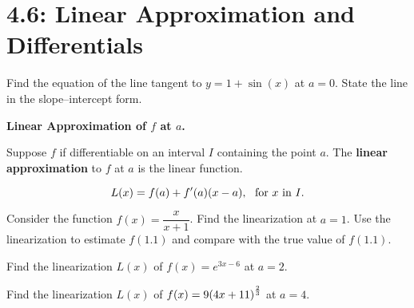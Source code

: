 \documentclass[answers]{exam}
\begin{document}
\section{4.6: Linear Approximation and Differentials}
\begin{ex*}
  Find the equation of the line tangent to $y=1+\sin(x)$ at $a=0$. State the line in the slope--intercept form.
\end{ex*}
\begin{flushright}
\end{flushright}
\begin{defn*}
  \textbf{Linear Approximation of $f$ at $a$.}
  
  Suppose $f$ if differentiable on an interval $I$ containing the point $a$. The \textbf{linear approximation} to $f$ at $a$ is the linear function.
  
  $$L(x)=f(a)+f'(a)(x-a),\ \textnormal{ for } x \textnormal{ in } I.$$
\end{defn*}
\pagebreak

\begin{ex*}
  Consider the function $f(x)=\dfrac{x}{x+1}$. Find the linearization at $a=1$. Use the linearization to estimate $f(1.1)$ and compare with the true value of $f(1.1)$.
\end{ex*}
\pagebreak

\begin{ex*}
  Find the linearization $L(x)$ of $f(x)=e^{3x-6}$ at $a=2$.
\end{ex*}

\begin{ex*}
  Find the linearization $L(x)$ of $f(x)=9{\left(4x+11\right)}^\frac{2}{3}$ at $a=4$.
\end{ex*}
\end{document}
